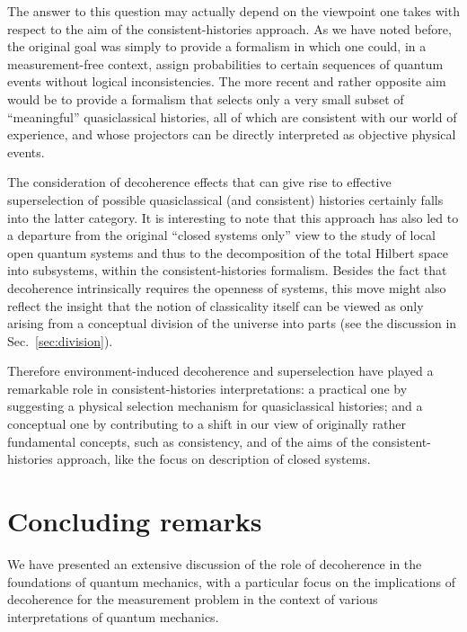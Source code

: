 \documentclass[rmp,aps,amsmath,amsfonts,noshowkeys,noshowpacs,12pt]{revtex4}
\begin{document}
The answer to this question may actually depend on the viewpoint one
takes with respect to the aim of the consistent-histories approach. As
we have noted before, the original goal was simply to provide a
formalism in which one could, in a measurement-free context, assign
probabilities to certain sequences of quantum events without logical
inconsistencies. The more recent and rather opposite aim would be to
provide a formalism that selects only a very small subset of
``meaningful'' quasiclassical histories, all of which are consistent
with our world of experience, and whose projectors can be directly
interpreted as objective physical events.

The consideration of decoherence effects that can give rise to
effective superselection of possible quasiclassical (and consistent)
histories certainly falls into the latter category. It is interesting
to note that this approach has also led to a departure from the
original ``closed systems only'' view to the study of local open
quantum systems and thus to the decomposition of the total Hilbert
space into subsystems, within the consistent-histories formalism.
Besides the fact that decoherence intrinsically requires the openness
of systems, this move might also reflect the insight that the notion
of classicality itself can be viewed as only arising from a conceptual
division of the universe into parts (see the discussion in
Sec.~\ref{sec:division}).

Therefore environment-induced decoherence and superselection have
played a remarkable role in consistent-histories interpretations: a
practical one by suggesting a physical selection mechanism for
quasiclassical histories; and a conceptual one by contributing to a
shift in our view of originally rather fundamental concepts, such as
consistency, and of the aims of the consistent-histories approach,
like the focus on description of closed systems.


\section{Concluding remarks}

We have presented an extensive discussion of the role of decoherence
in the foundations of quantum mechanics, with a particular focus on
the implications of decoherence for the measurement problem in the
context of various interpretations of quantum mechanics.
\end{document}
